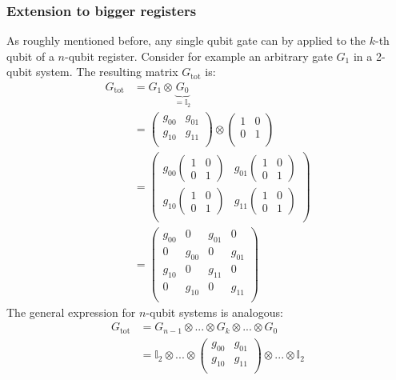 \documentclass[bibliography=totocnumbered]{article}
\theoremstyle{NoticeStyle}
\begin{document}
\subsubsection{Extension to bigger registers}
As roughly mentioned before, any single qubit gate can by applied to the $k$-th qubit of a $n$-qubit register. Consider for example an arbitrary gate $G_1$ in a 2-qubit system. The resulting matrix $G_\text{tot}$ is:
%
\begin{align}
	G_\text{tot} 
	&= G_1 \otimes \underbrace{G_0}_{=\mathbb{I}_2}\\
	&=
	\begin{pmatrix}
		g_{00} & g_{01}\\
		g_{10} & g_{11}\\
	\end{pmatrix}
	\otimes
	\begin{pmatrix}
		1 & 0\\
		0 & 1\\
	\end{pmatrix}\\
	&=
	\begin{pmatrix}
		g_{00} \left(\begin{smallmatrix}1& 0\\ 0& 1\end{smallmatrix}\right) & g_{01} \left(\begin{smallmatrix}1& 0\\ 0& 1\end{smallmatrix}\right)\\
		g_{10} \left(\begin{smallmatrix}1& 0\\ 0& 1\end{smallmatrix}\right) & g_{11} \left(\begin{smallmatrix}1& 0\\ 0& 1\end{smallmatrix}\right)\\
	\end{pmatrix}
	\\
	&=
	\begin{pmatrix}
		g_{00} & 0 & g_{01} & 0\\
		0 & g_{00} & 0 & g_{01}\\
		g_{10} & 0 & g_{11} & 0\\
		0 & g_{10} & 0 & g_{11}\\
	\end{pmatrix}
\end{align}
%
%
The general expression for $n$-qubit systems is analogous:
%
\begin{align}
	G_\text{tot} 
	&= G_{n-1} \otimes ... \otimes G_k \otimes ...\otimes G_0\\
	&= \mathbb{I}_2 \otimes ... \otimes
	\left(
	\begin{smallmatrix}
		g_{00} & g_{01}\\
		g_{10} & g_{11}\\
	\end{smallmatrix}
	\right)
	\otimes ...\otimes \mathbb{I}_2
\end{align}
%
\end{document}
